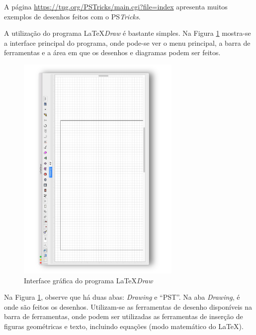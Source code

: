 \begin{marker}
A página \url{https://tug.org/PSTricks/main.cgi?file=index} apresenta muitos exemplos de desenhos feitos com o PS\textit{Tricks}.
\end{marker}

A utilização do programa \LaTeX\textit{Draw} é bastante simples. Na Figura \ref{fig:interld} mostra-se a interface principal do programa, onde pode-se ver o menu principal, a barra de ferramentas e a área em que os desenhos e diagramas podem ser feitos.

\begin{figure}[H]
\caption{Interface gráfica do programa \LaTeX\textit{Draw}}
\vspace{6mm}
    \begin{center}
        \includegraphics[width=0.7\textwidth,angle=-90]{./docs/figs/ldraw1.pdf}
    \end{center}
\vspace{4mm}
\label{fig:interld}
\end{figure}

Na Figura \ref{fig:interld}, observe que há duas abas: \textit{Drawing} e ``PST''. Na aba \textit{Drawing}, é onde são feitos os desenhos. Utilizam-se as ferramentas de desenho disponíveis na barra de ferramentas, onde podem ser utilizadas as ferramentas de inserção de figuras geométricas e texto, incluindo equações (modo matemático do \LaTeX{}).

